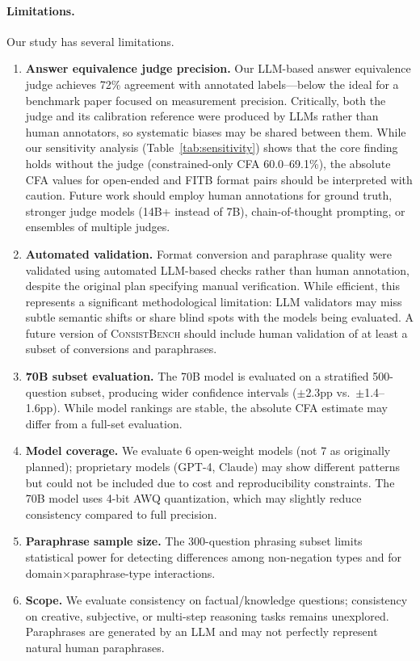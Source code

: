 \documentclass{article}
\newcommand{\consistbench}{\textsc{ConsistBench}}
\begin{document}
\paragraph{Limitations.}
Our study has several limitations.
\begin{enumerate}
    \item \textbf{Answer equivalence judge precision.} Our LLM-based answer equivalence judge achieves 72\% agreement with annotated labels---below the ideal for a benchmark paper focused on measurement precision. Critically, both the judge and its calibration reference were produced by LLMs rather than human annotators, so systematic biases may be shared between them. While our sensitivity analysis (Table~\ref{tab:sensitivity}) shows that the core finding holds without the judge (constrained-only CFA 60.0--69.1\%), the absolute CFA values for open-ended and FITB format pairs should be interpreted with caution. Future work should employ human annotations for ground truth, stronger judge models (14B+ instead of 7B), chain-of-thought prompting, or ensembles of multiple judges.
    \item \textbf{Automated validation.} Format conversion and paraphrase quality were validated using automated LLM-based checks rather than human annotation, despite the original plan specifying manual verification. While efficient, this represents a significant methodological limitation: LLM validators may miss subtle semantic shifts or share blind spots with the models being evaluated. A future version of \consistbench{} should include human validation of at least a subset of conversions and paraphrases.
    \item \textbf{70B subset evaluation.} The 70B model is evaluated on a stratified 500-question subset, producing wider confidence intervals ($\pm$2.3pp vs.\ $\pm$1.4--1.6pp). While model rankings are stable, the absolute CFA estimate may differ from a full-set evaluation.
    \item \textbf{Model coverage.} We evaluate 6 open-weight models (not 7 as originally planned); proprietary models (GPT-4, Claude) may show different patterns but could not be included due to cost and reproducibility constraints. The 70B model uses 4-bit AWQ quantization, which may slightly reduce consistency compared to full precision.
    \item \textbf{Paraphrase sample size.} The 300-question phrasing subset limits statistical power for detecting differences among non-negation types and for domain$\times$paraphrase-type interactions.
    \item \textbf{Scope.} We evaluate consistency on factual/knowledge questions; consistency on creative, subjective, or multi-step reasoning tasks remains unexplored. Paraphrases are generated by an LLM and may not perfectly represent natural human paraphrases.
\end{enumerate}
\end{document}
